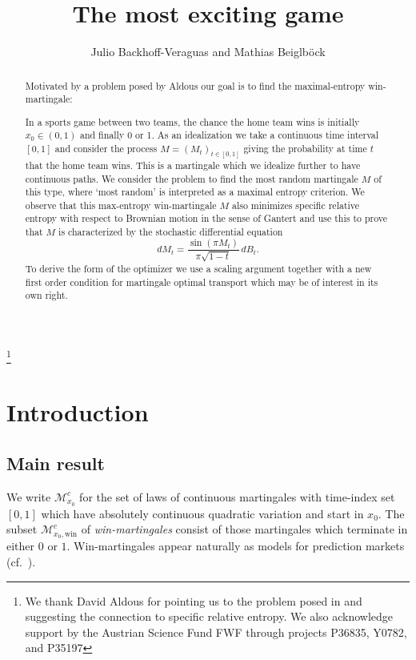 \documentclass[reqno, a4paper]{amsart}
\theoremstyle{remark}
\newcommand{\1}{\mathbbm 1}
\numberwithin{equation}{section}
\numberwithin{theorem}{section}
\newcommand{\MB}[1]{{\color{purple}{[MB: #1]}}}
\begin{document}
\title[The most exciting game]{The most exciting game}%

\author{Julio Backhoff-Veraguas and Mathias Beiglb\"ock}\thanks{We thank David Aldous for pointing us to the problem posed in  \cite{Al22a, Al22b} and suggesting the connection to specific relative entropy. We also acknowledge support by the Austrian Science Fund FWF through projects P36835, Y0782, and P35197 }

\begin{abstract} Motivated by a problem posed by Aldous \cite{Al22a, Al22b} our goal is to find the maximal-entropy win-martingale: 

In a sports game between two teams, the chance the home team wins is initially $x_0 \in (0,1)$
 and finally 
0 or 1. As an idealization we take a continuous time interval $[0,1]$ and consider the process $M=(M_t)_{t\in [0,1]}$
 giving the probability at time 
$t$ that the home team wins.  This is a martingale which we idealize further to have continuous paths. 
We consider the problem to find the most random martingale $M$ of this type, where `most random' is interpreted as a maximal entropy criterion.  We observe that this max-entropy win-martingale $M$ also minimizes specific relative entropy with respect to Brownian motion in the sense of Gantert  \cite{Ga91} and use this to prove that $M$ is characterized by the stochastic differential equation
$$ dM_t = \frac{\sin (\pi M_t )} {\pi\sqrt {1-t}}\, dB_t.$$
To derive the form of the optimizer we use a scaling argument together with a new first order condition for martingale optimal transport which may be of interest in its own right. 
\end{abstract}

\maketitle

\section{Introduction}

\subsection{Main result}
We  write  $\mathcal M^c_{x_0}$ for the set of laws of continuous martingales  with time-index set $[0,1]$ which  have  absolutely continuous quadratic variation and start in $x_0$. The subset $\mathcal M^c_{x_0, \text{win}}$ of  \emph{win-martingales}   consist of those martingales which  terminate in either $0$ or $1$. Win-martingales appear naturally as models for prediction markets (cf.\ \cite{Al13}). %
\end{document}
